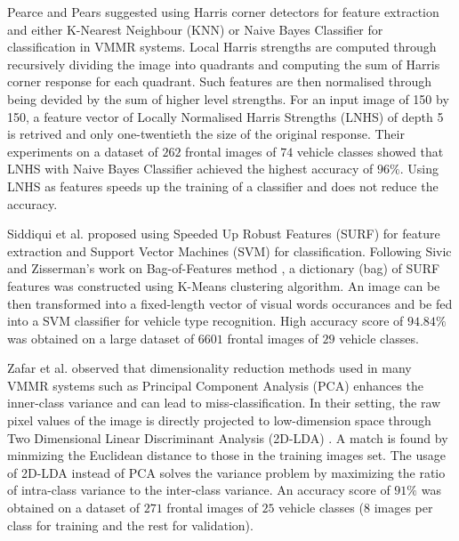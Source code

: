 Pearce and Pears \citep{pearce2011automatic} suggested using Harris corner detectors \citep{harris1988combined} for feature extraction and either K-Nearest Neighbour (KNN) or Naive Bayes Classifier for classification in VMMR systems.
Local Harris strengths are computed through recursively dividing the image into quadrants and computing the sum of Harris corner response for each quadrant.
Such features are then normalised through being devided by the sum of higher level strengths.
For an input image of 150 by 150, a feature vector of Locally Normalised Harris Strengths (LNHS) of depth 5 is retrived and only one-twentieth the size of the original response.
Their experiments on a dataset of $262$ frontal images of $74$ vehicle classes showed that LNHS with Naive Bayes Classifier achieved the highest accuracy of $96\%$. 
Using LNHS as features speeds up the training of a classifier and does not reduce the accuracy.


Siddiqui et al. \citep{siddiqui2016real} proposed using Speeded Up Robust Features (SURF) \citep{bay2006surf} for feature extraction and Support Vector Machines (SVM) for classification.
Following Sivic and Zisserman's work on Bag-of-Features method \citep{sivic2003video}, a dictionary (bag) of SURF features was constructed using K-Means clustering algorithm.
An image can be then transformed into a fixed-length vector of visual words occurances and be fed into a SVM classifier for vehicle type recognition.
High accuracy score of $94.84\%$ was obtained on a large dataset of $6601$ frontal images of $29$ vehicle classes.


Zafar et al. \citep{zafar2007two} observed that dimensionality reduction methods used in many VMMR systems such as Principal Component Analysis (PCA) enhances the inner-class variance and can lead to miss-classification.
In their setting, the raw pixel values of the image is directly projected to low-dimension space through Two Dimensional Linear Discriminant Analysis (2D-LDA) \citep{li20052d}.
A match is found by minmizing the Euclidean distance to those in the training images set.
The usage of 2D-LDA instead of PCA solves the variance problem by maximizing the ratio of intra-class variance to the inter-class variance.
An accuracy score of $91\%$ was obtained on a dataset of $271$ frontal images of $25$ vehicle classes ($8$ images per class for training and the rest for validation).

